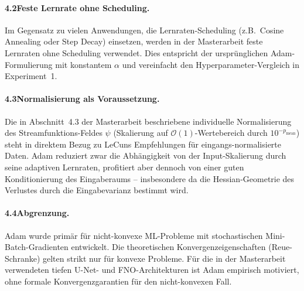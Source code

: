 \documentclass[a4paper,12pt]{article}
\begin{document}
\paragraph{4.2\quad Feste Lernrate ohne Scheduling.}
Im Gegensatz zu vielen Anwendungen, die Lernraten-Scheduling (z.B.\ Cosine Annealing oder
Step Decay) einsetzen, werden in der Masterarbeit feste Lernraten ohne Scheduling verwendet.
Dies entspricht der ursprünglichen Adam-Formulierung mit konstantem $\alpha$ und vereinfacht
den Hyperparameter-Vergleich in Experiment~1.

\paragraph{4.3\quad Normalisierung als Voraussetzung.}
Die in Abschnitt~4.3 der Masterarbeit beschriebene individuelle Normalisierung des Streamfunktions-Feldes
$\psi$ (Skalierung auf $\mathcal{O}(1)$-Wertebereich durch $10^{-p_\text{mean}}$) steht in
direktem Bezug zu LeCuns Empfehlungen für eingangs-normalisierte Daten. Adam reduziert zwar
die Abhängigkeit von der Input-Skalierung durch seine adaptiven Lernraten, profitiert aber
dennoch von einer guten Konditionierung des Eingaberaums -- insbesondere da die Hessian-Geometrie
des Verlustes durch die Eingabevarianz bestimmt wird.

\paragraph{4.4\quad Abgrenzung.}
Adam wurde primär für nicht-konvexe ML-Probleme mit stochastischen Mini-Batch-Gradienten entwickelt.
Die theoretischen Konvergenzeigenschaften (Reue-Schranke) gelten strikt nur für konvexe Probleme.
Für die in der Masterarbeit verwendeten tiefen U-Net- und FNO-Architekturen ist Adam empirisch
motiviert, ohne formale Konvergenzgarantien für den nicht-konvexen Fall.
\end{document}
